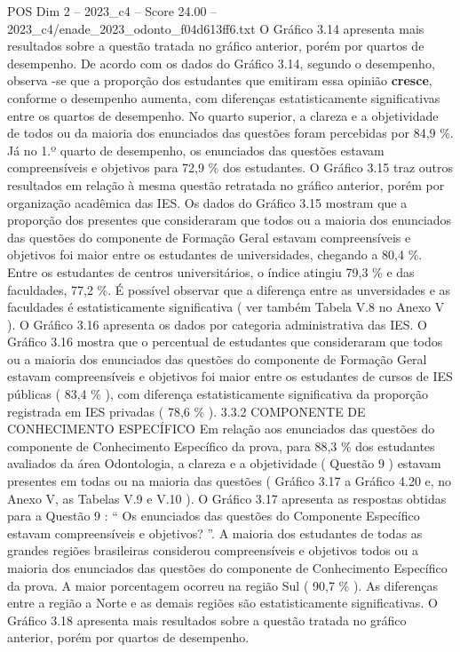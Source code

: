 \begin{textsample}{POS Dim 2 – 2023\_c4 – Score 24.00 – 2023\_c4/enade\_2023\_odonto\_f04d613ff6.txt}
O Gráfico 3.14 apresenta mais resultados sobre a questão tratada no gráfico anterior, porém por quartos de desempenho.
De acordo com os dados do Gráfico 3.14, segundo o desempenho, observa -se que a proporção dos estudantes que emitiram essa opinião \textbf{cresce}, conforme o desempenho aumenta, com diferenças estatisticamente significativas entre os quartos de desempenho.
No quarto superior, a clareza e a objetividade de todos ou da maioria dos enunciados das questões foram percebidas por 84,9 \%.
Já no 1.º quarto de desempenho, os enunciados das questões estavam compreensíveis e objetivos para 72,9 \% dos estudantes.
O Gráfico 3.15 traz outros resultados em relação à mesma questão retratada no gráfico anterior, porém por organização acadêmica das IES.
Os dados do Gráfico 3.15 mostram que a proporção dos presentes que consideraram que todos ou a maioria dos enunciados das questões do componente de Formação Geral estavam compreensíveis e objetivos foi maior entre os estudantes de universidades, chegando a 80,4 \%.
Entre os estudantes de centros universitários, o índice atingiu 79,3 \% e das faculdades, 77,2 \%.
É possível observar que a diferença entre as unversidades e as faculdades é estatisticamente significativa ( ver também Tabela V.8 no Anexo V ).
O Gráfico 3.16 apresenta os dados por categoria administrativa das IES.
O Gráfico 3.16 mostra que o percentual de estudantes que consideraram que todos ou a maioria dos enunciados das questões do componente de Formação Geral estavam compreensíveis e objetivos foi maior entre os estudantes de cursos de IES públicas ( 83,4 \% ), com diferença estatisticamente significativa da proporção registrada em IES privadas ( 78,6 \% ). 3.3.2 COMPONENTE DE CONHECIMENTO ESPECÍFICO Em relação aos enunciados das questões do componente de Conhecimento Específico da prova, para 88,3 \% dos estudantes avaliados da área Odontologia, a clareza e a objetividade ( Questão 9 ) estavam presentes em todas ou na maioria das questões ( Gráfico 3.17 a Gráfico 4.20 e, no Anexo V, as Tabelas V.9 e V.10 ).
O Gráfico 3.17 apresenta as respostas obtidas para a Questão 9 : “ Os enunciados das questões do Componente Específico estavam compreensíveis e objetivos? ”.
A maioria dos estudantes de todas as grandes regiões brasileiras considerou compreensíveis e objetivos todos ou a maioria dos enunciados das questões do componente de Conhecimento Específico da prova.
A maior porcentagem ocorreu na região Sul ( 90,7 \% ).
As diferenças entre a região a Norte e as demais regiões são estatisticamente significativas.
O Gráfico 3.18 apresenta mais resultados sobre a questão tratada no gráfico anterior, porém por quartos de desempenho.

\end{textsample}

